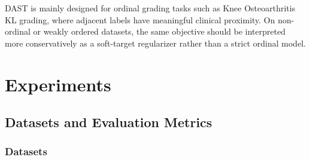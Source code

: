 \documentclass[runningheads]{llncs}
\begin{document}
DAST is mainly designed for ordinal grading tasks such as Knee Osteoarthritis KL grading, where adjacent labels have meaningful clinical proximity. On non-ordinal or weakly ordered datasets, the same objective should be interpreted more conservatively as a soft-target regularizer rather than a strict ordinal model.

\section{Experiments}
\subsection{Datasets and Evaluation Metrics}
\subsubsection{Datasets}
\end{document}
